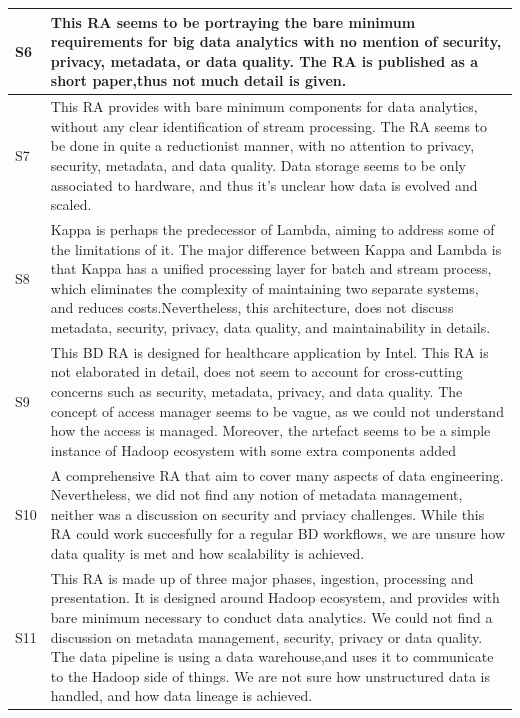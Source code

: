 \documentclass[review]{elsarticle}
\begin{document}
\begin{longtable}{|p{0.5cm}|p{11cm}|}
        \hline
        S6 & This RA seems to be portraying the bare minimum requirements for big data analytics with no mention of security, privacy, metadata, or data quality. The RA is published as a short paper,thus not much detail is given. \\
        \hline
        S7 & This RA provides with bare minimum components for data analytics, without any clear identification of stream processing. The RA seems to be done in quite a reductionist manner, with no attention to privacy, security, metadata, and data quality. Data storage seems to be only associated to hardware, and thus it's unclear how data is evolved and scaled.  \\
        \hline
        S8 & Kappa is perhaps the predecessor of Lambda, aiming to address some of the limitations of it. The major difference between Kappa and Lambda is that Kappa has a unified processing layer for batch and stream process, which eliminates the complexity of maintaining two separate systems, and reduces costs.Nevertheless, this architecture, does not discuss metadata, security, privacy, data quality, and maintainability in details.  \\
        \hline
        S9 & This BD RA is designed for healthcare application by Intel. This RA is not elaborated in detail, does not seem to account for cross-cutting concerns such as security, metadata, privacy, and data quality. The concept of access manager seems to be vague, as we could not understand how the access is managed. Moreover, the artefact seems to be a simple instance of Hadoop ecosystem with some extra components added   \\
        \hline
        S10 & A comprehensive RA that aim to cover many aspects of data engineering. Nevertheless, we did not find any notion of metadata management, neither was a discussion on security and prviacy challenges. While this RA could work succesfully for a regular BD workflows, we are unsure how data quality is met and how scalability is achieved.  \\
        \hline
        S11 & This RA is made up of three major phases, ingestion, processing and presentation. It is designed around Hadoop ecosystem, and provides with bare minimum necessary to conduct data analytics. We could not find a discussion on metadata management, security, privacy or data quality. The data pipeline is using a data warehouse,and uses it to communicate to the Hadoop side of things. We are not sure how unstructured data is handled, and how data lineage is achieved.  \\

\end{longtable}
\end{document}
